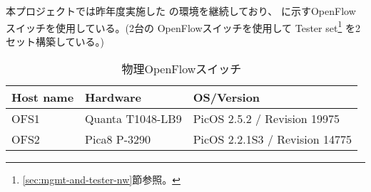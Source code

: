 本プロジェクトでは昨年度実施した \lopj の環境を継続しており、
に示すOpenFlowスイッチを使用している。(2台の
OpenFlowスイッチを使用して Tester
set\footnote{\ref{sec:mgmt-and-tester-nw}節参照。} を2セット構築している。)

\begin{table}[h]
 \centering
 \caption{物理OpenFlowスイッチ}
 \label{tab:psw-list}
  \begin{tabular}{l|l|l}
   \hline
   Host name & Hardware & OS/Version \\
   \hline
   \hline
   OFS1 & Quanta T1048-LB9 & PicOS 2.5.2 / Revision 19975 \\
   OFS2 & Pica8 P-3290 & PicOS 2.2.1S3 / Revision 14775 \\
   \hline
 \end{tabular}
\end{table}

